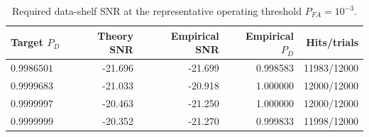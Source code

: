 \begin{table}[ht]
\centering
\caption{Required data-shelf SNR at the representative operating threshold $P_{FA}=10^{-3}$.}
\label{tab:required-snr-operating-point}
\begin{tabular}{l r r r r}
\toprule
Target $P_D$ & Theory SNR & Empirical SNR & Empirical $P_D$ & Hits/trials \\
\midrule
$0.9986501$ & -21.696 & -21.699 & 0.998583 & 11983/12000 \\
$0.9999683$ & -21.033 & -20.918 & 1.000000 & 12000/12000 \\
$0.9999997$ & -20.463 & -21.250 & 1.000000 & 12000/12000 \\
$0.9999999$ & -20.352 & -21.270 & 0.999833 & 11998/12000 \\
\bottomrule
\end{tabular}
\end{table}